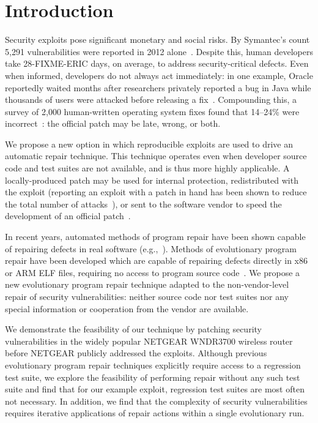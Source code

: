 \documentclass{sigcomm-alternate}
\begin{document}
\section{Introduction}
\label{sec-1}
Security exploits pose significant monetary and social risks. By Symantec's
count 5,291 vulnerabilities were reported in 2012
alone~\cite{symantec2013threat}. Despite this, human developers take
28-FIXME-ERIC days, on average, to address security-critical defects. Even
when informed, developers do not always act immediately:  in one example,
Oracle reportedly waited months after researchers privately reported a bug
in Java while thousands of users were attacked before releasing a
fix~\cite{greenberg2012oracle}.  Compounding this, a survey of 2,000
human-written operating system fixes found that 14--24\% were
incorrect~\cite{fixes-become-bugs}: the official patch may be late, wrong,
or both.  

We propose a new option in which reproducible exploits are used to drive an
automatic repair technique. This technique operates even when developer
source code and test suites are not available, and is thus more highly
applicable. A locally-produced patch may be used for internal protection,
redistributed with the exploit (reporting an exploit with a patch in hand
has been shown to reduce the total number of attacks~\cite{arora2006does}),
or sent to the software vendor to speed the development of an official
patch~\cite{weimer06}.

In recent years, automated methods of program repair have been shown
capable of repairing defects in real software
(e.g.,~\cite{clearview,genprog-tse-security,par,nguyen2013semfix}).
Methods of evolutionary program repair have been developed which are
capable of repairing defects directly in x86 or ARM ELF files,
requiring no access to program source code~\cite{schulte2013embedded}.  
We propose a new evolutionary program repair technique adapted to
the non-vendor-level repair of security vulnerabilities: neither source
code nor test suites nor any special information or cooperation from the
vendor are available. 

We demonstrate the feasibility of our technique by patching security
vulnerabilities in the widely popular NETGEAR WNDR3700 wireless router
before NETGEAR publicly addressed the exploits.  Although previous
evolutionary program repair techniques explicitly require access to a
regression test suite, we explore the feasibility of performing repair
without any such test suite and find that for our example exploit,
regression test suites are most often not necessary. In addition, we find
that the complexity of security vulnerabilities requires iterative
applications of repair actions within a single evolutionary run. 
\end{document}
